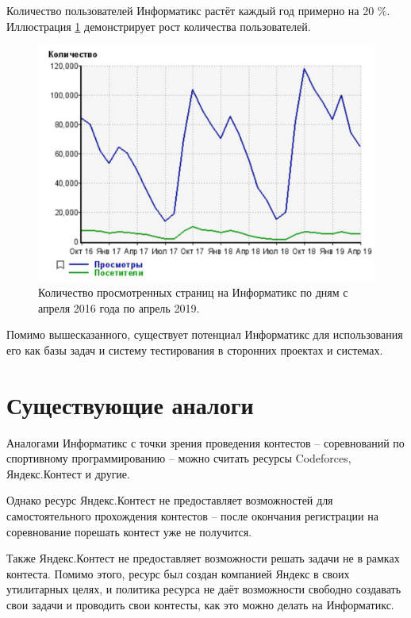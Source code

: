 Количество пользователей Информатикс растёт каждый год примерно на 20 \%. 
Иллюстрация \ref{fig:people_count} демонстрирует рост количества пользователей.

\begin{figure}
  \centering
  \includegraphics[width=\textwidth]{figures/pepole_count.png}
  \caption{Количество просмотренных страниц на Информатикс по дням с апреля 2016 года по апрель 2019.}
  \label{fig:people_count}
\end{figure}

Помимо вышесказанного, существует потенциал Информатикс для использования его как базы задач и систему тестирования в сторонних проектах и системах.

\section{Существующие аналоги}

Аналогами Информатикс с точки зрения проведения контестов
-- соревнований по спортивному программированию -- 
можно считать ресурсы Codeforces, Яндекс.Контест и другие.

Однако ресурс Яндекс.Контест не предоставляет возможностей для самостоятельного прохождения контестов -- после окончания регистрации на соревнование порешать контест уже не получится.

Также Яндекс.Контест не предоставляет возможности решать задачи не в рамках контеста.
Помимо этого, ресурс был создан компанией Яндекс в своих утилитарных целях,
и политика ресурса не даёт возможности свободно создавать свои задачи
и проводить свои контесты, как это можно делать на Информатикс.

